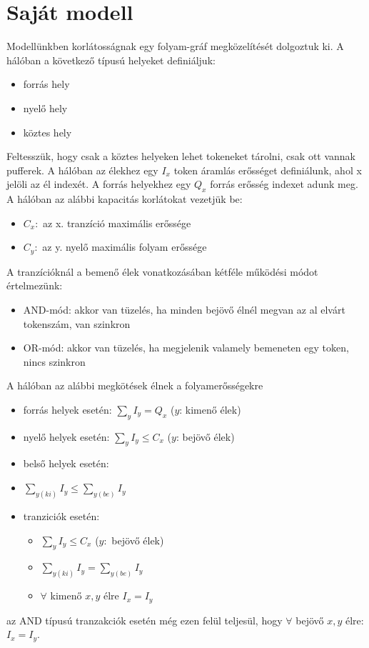 
\section{Saját modell}

Modellünkben korlátosságnak egy folyam-gráf megközelítését dolgoztuk ki.  A hálóban a következő típusú helyeket definiáljuk:
\begin{itemize}
\item forrás hely
\item nyelő hely
\item köztes hely
\end{itemize}
Feltesszük, hogy csak a köztes helyeken lehet tokeneket tárolni, csak ott vannak pufferek. A hálóban az élekhez egy $I_x$ token áramlás erősséget definiálunk, ahol x jelöli az él indexét. A forrás helyekhez egy $Q_x$ forrás erősség indexet adunk meg. A hálóban az alábbi kapacitás korlátokat vezetjük be:
\begin{itemize}
\item $C_x:$ az x. tranzíció maximális erőssége 
\item $C_y:$ az y. nyelő maximális folyam erőssége 
\end{itemize}

A tranzícióknál a bemenő élek vonatkozásában kétféle működési módot értelmezünk:
\begin{itemize}
\item AND-mód: akkor van tüzelés, ha minden bejövő élnél megvan az al elvárt tokenszám, van szinkron
\item OR-mód: akkor van tüzelés, ha megjelenik valamely bemeneten egy token, nincs szinkron  
\end{itemize}
A hálóban az alábbi megkötések élnek a folyamerősségekre
\begin{itemize}
\item forrás helyek esetén: $\sum_y I_y=Q_x$ ($y$: kimenő élek)
\item nyelő helyek esetén: $\sum_y I_y \leq C_x$ ($y$: bejövő élek)
\item belső helyek esetén: 
\item$\sum_{y(ki)} I_y\leq \sum_{y(be)} I_y$
\item tranziciók esetén: 
\begin{itemize}
\item $\sum_y I_y\leq C_x$ ($y:$ bejövő élek)
\item $\sum_{y(ki)} I_y = \sum_{y(be)} I_y$
\item $\forall$ kimenő $x,y$ élre $I_x=I_y$
\end{itemize}
\end{itemize}
az AND típusú tranzakciók esetén még ezen felül teljesül, hogy $\forall$ bejövő $x,y$ élre:\\
$I_x = I_y$.

